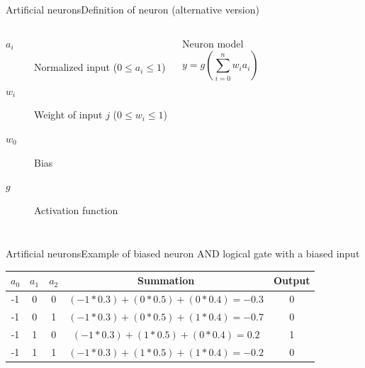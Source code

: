 \documentclass[10pt,compress]{beamer} %
\begin{document}
\begin{frame}{Artificial neurons}{Definition of neuron (alternative version)}
    

	\bigskip
    \begin{columns}
		\begin{description}
		\item[$a_i$] Normalized input ($0 \le a_i \le 1$)
		\item[$w_{i}$] Weight of input $j$ ($0 \le w_{i} \le 1$)
		\item[$w_0$] Bias
		\item[$g$] Activation function
		\end{description}

	   \begin{block}{Neuron model}
	   \vspace{-0.5cm}
	   \begin{equation*}
	   y=g\left( \sum_{i=0}^n w_{i} a_i \right)
	   \end{equation*}
	   \end{block}
    \end{columns}
\end{frame}

\begin{frame}{Artificial neurons}{Example of biased neuron}
	AND logical gate with a biased input

	\centering 

	\footnotesize{
		\centering \begin{tabular}{|c|c|c|c|c|}\hline
		$a_0$ & $a_1$ & $a_2$ & Summation & Output\\\hline
		-1    & 0     & 0     & $(-1 * 0.3) + (0*0.5) + (0*0.4) = -0.3$ & 0\\
		-1    & 0     & 1     & $(-1 * 0.3) + (0*0.5) + (1*0.4) = -0.7$ & 0\\
		-1    & 1     & 0     & $(-1 * 0.3) + (1*0.5) + (0*0.4) = 0.2$ & 1\\
		-1    & 1     & 1     & $(-1 * 0.3) + (1*0.5) + (1*0.4) = -0.2$ & 0\\\hline
		\end{tabular}
	}
\end{frame}
\end{document}
